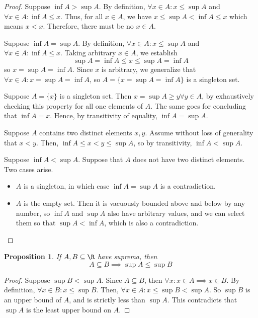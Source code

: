 \documentclass[letterpaper,11pt]{article}
\newtheorem{prop}{Proposition}
\begin{document}
\begin{proof}
  Suppose $\inf A > \sup A$.
  By definition, $\forall x \in A: x \leq \sup A$
  and $\forall x \in A: \inf A \leq x$.
  Thus, for all $x \in A$, we have $x \leq \sup A < \inf A \leq x$ which means
  $x < x$. Therefore, there must be no $x \in A$.

  Suppose $\inf A = \sup A$.
  By definition, $\forall x \in A: x \leq \sup A$
  and $\forall x \in A: \inf A \leq x$.
  Taking arbitrary $x \in A$, we establish
  \begin{equation*}
    \sup A = \inf A \leq x \leq \sup A = \inf A
  \end{equation*}
  so $x = \sup A = \inf A$. Since $x$ is arbitrary, we generalize that
  $\forall x \in A: x = \sup A = \inf A$, so
  $A = \{x = \sup A = \inf A\}$ is a singleton set.

  Suppose $A = \{x\}$ is a singleton set. Then
  $x = \sup A \geq y \forall y \in A$, by exhaustively checking this property
  for all one elements of $A$. The same goes for concluding that $\inf A = x$.
  Hence, by transitivity of equality, $\inf A = \sup A$.

  Suppose $A$ contains two distinct elements $x, y$. Assume without loss of
  generality that $x < y$. Then, $\inf A \leq x < y \leq \sup A$, so by
  transitivity, $\inf A < \sup A$.

  Suppose $\inf A < \sup A$. Suppose that $A$ does not have two distinct
  elements. Two cases arise.
  \begin{itemize}
    \item $A$ is a singleton, in which case $\inf A = \sup A$ is a
      contradiction.
    \item $A$ is the empty set. Then it is vacuously bounded above and below by
      any number, so $\inf A$ and $\sup A$ also have arbitrary values, and we
      can select them so that $\sup A < \inf A$, which is also a contradiction.
  \end{itemize}
\end{proof}

\begin{prop}
  If $A, B \subseteq \R$ have suprema, then
  \begin{equation*}
    A \subseteq B \implies \sup A \leq \sup B
  \end{equation*}
  \label{prop:subset-sup-leq}
\end{prop}

\begin{proof}
  Suppose $\sup B < \sup A$.
  Since $A \subseteq B$, then $\forall x: x \in A \implies x \in B$.
  By definition, $\forall x \in B: x \leq \sup B$.
  Then, $\forall x \in A: x \leq \sup B < \sup A$.
  So $\sup B$ is an upper bound of $A$, and is strictly less than $\sup A$.
  This contradicts that $\sup A$ is the least upper bound on $A$.
\end{proof}
\end{document}
